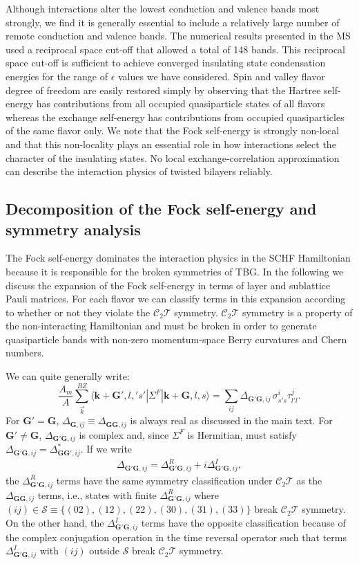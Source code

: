 \documentclass[aps,prl,reprint,amssymb,groupedaddress,twocolumn]{revtex4}
\newcommand{\CT}{$\mathcal{C}_2\mathcal{T}$ }
\begin{document}
Although interactions alter the lowest conduction and valence bands most strongly,
we find it is generally essential to include a relatively large number of remote conduction and valence 
bands.  The numerical results presented in the MS used a reciprocal space cut-off that allowed a total of 148 bands.
This reciprocal space cut-off is sufficient to achieve converged insulating state 
condensation energies for the range of $\epsilon$ values we have considered.  
Spin and valley flavor degree of freedom are easily restored simply 
by observing that the Hartree self-energy has contributions from all occupied quasiparticle
states of all flavors whereas 
the exchange self-energy  has contributions from occupied quasiparticles 
of the same flavor only.  We note that the Fock self-energy is strongly non-local and that 
this non-locality plays an essential role in how interactions select the character 
of the insulating states.  No local exchange-correlation approximation can 
describe the interaction physics of twisted bilayers reliably.  

\subsection{Decomposition of the Fock self-energy and symmetry analysis}
The Fock self-energy dominates the interaction physics in the SCHF Hamiltonian
because it is responsible for
the broken symmetries of TBG.  In the following we discuss the expansion of 
the Fock self-energy in terms of layer and sublattice Pauli matrices.
For each flavor we can classify terms in this expansion 
according to whether or not they violate the \CT symmetry.
\CT symmetry is a property of the non-interacting Hamiltonian and 
must be broken in order to generate quasiparticle bands with non-zero momentum-space 
Berry curvatures and Chern numbers.  

We can quite generally write:
\begin{equation}
\frac{A_m}{A} \sum_{\vec{k}}^{BZ} \langle \bm{k}+\bm{G}', l,'s' |\Sigma^{F} | \bm{k}+\bm{G}, l,s\rangle = 
\sum_{ij} \Delta_{\bm{G}'\bm{G},ij}  \, \sigma^i_{s's} \tau^j_{l'l}. 
\end{equation}
For $\bm{G}'=\bm{G}$, $\Delta_{\bm{G},ij}\equiv\Delta_{\bm{G}\bm{G},ij}$ is always real as discussed in the main text.
For $\bm{G}'\neq \bm{G}$, $\Delta_{\bm{G}'\bm{G},ij}$ is complex and,
since $\Sigma^{F} $ is Hermitian, must satisfy
$\Delta_{\bm{G}'\bm{G},ij}=\Delta^*_{\bm{G}\bm{G}',ij}$.
If we write 
\begin{align}
\Delta_{\bm{G}'\bm{G},ij}=\Delta^R_{\bm{G}'\bm{G},ij}+i\Delta^I_{\bm{G}'\bm{G},ij},
\end{align}
the $\Delta^R_{\bm{G}'\bm{G},ij}$ terms have the same symmetry classification under 
\CT as the $\Delta_{\bm{G}\bm{G},ij}$ terms, 
i.e., states with finite $\Delta^R_{\bm{G}'\bm{G},ij}$ where $(ij)\in \mathcal{S}\equiv\{(02),(12),(22),(30),(31), (33)\}$ break \CT symmetry.  
On the other hand, the $\Delta^I_{\bm{G}'\bm{G},ij}$ terms have the opposite classification because 
of the complex conjugation operation in the time reversal operator
such that terms $\Delta^I_{\bm{G}'\bm{G},ij}$ with $(ij)$ outside $\mathcal{S}$
break \CT symmetry.
\end{document}
